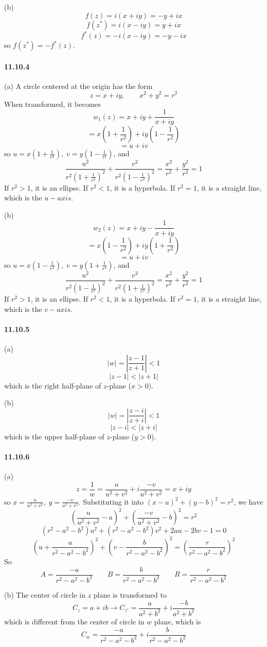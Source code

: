 \documentclass[a4paper]{article}
\begin{document}
(b)
\[
f(z)=i(x+iy)=-y+ix
\]
\[
f(z^*)=i(x-iy)=y+ix
\]
\[
f^*(z)=-i(x-iy)=-y-ix
\]
so $f(z^*)=-f^*(z)$.

\paragraph{11.10.4}
(a)
A circle centered at the origin has the form
\[
z=x+iy,\qquad x^2+y^2=r^2
\]
When transformed, it becomes
\[
w_1(z)=x+iy+\frac{1}{x+iy}
\]
\[
=x(1+\frac{1}{r^2})+iy(1-\frac{1}{r^2})
\]
\[
=u+iv
\]
so $u=x(1+\frac{1}{r^2}),\;v=y(1-\frac{1}{r^2})$, and
\[
\frac{u^2}{r^2(1+\frac{1}{r^2})^2}+\frac{v^2}{r^2(1-\frac{1}{r^2})^2}=\frac{x^2}{r^2}+\frac{y^2}{r^2}=1
\]
If $r^2>1$, it is an ellipse. If $r^2<1$, it is a hyperbola. If $r^2=1$, it is a straight line, which is the $u-axis$.
\medskip

(b)
\[
w_2(z)=x+iy-\frac{1}{x+iy}
\]
\[
=x(1-\frac{1}{r^2})+iy(1+\frac{1}{r^2})
\]
\[
=u+iv
\]
so $u=x(1-\frac{1}{r^2}),\;v=y(1+\frac{1}{r^2})$, and
\[
\frac{u^2}{r^2(1-\frac{1}{r^2})^2}+\frac{v^2}{r^2(1+\frac{1}{r^2})^2}=\frac{x^2}{r^2}+\frac{y^2}{r^2}=1
\]
If $r^2>1$, it is an ellipse. If $r^2<1$, it is a hyperbola. If $r^2=1$, it is a straight line, which is the $v-axis$.

\paragraph{11.10.5}
(a)
\[
|w|=\left|\frac{z-1}{z+1} \right|<1
\]
\[
|z-1|<|z+1|
\]
which is the right half-plane of $z$-plane ($x>0$).
\medskip

(b)
\[
|w|=\left|\frac{z-i}{z+i} \right|<1
\]
\[
|z-i|<|z+i|
\]
which is the upper half-plane of $z$-plane ($y>0$).

\paragraph{11.10.6}
(a)
\[
z=\frac{1}{w}=\frac{u}{u^2+v^2}+i\frac{-v}{u^2+v^2}=x+iy
\]
so $x=\frac{u}{u^2+v^2},\;y=\frac{-v}{u^2+v^2}$. Substituting it into $(x-a)^2+(y-b)^2=r^2$, we have
\[
\left(\frac{u}{u^2+v^2}-a \right)^2+\left(\frac{-v}{u^2+v^2}-b \right)^2=r^2
\]
\[
(r^2-a^2-b^2)u^2+(r^2-a^2-b^2)v^2+2au-2bv-1=0
\]
\[
\left(u+\frac{a}{r^2-a^2-b^2} \right)^2+\left(v-\frac{b}{r^2-a^2-b^2} \right)^2=\left(\frac{r}{r^2-a^2-b^2}\right)^2
\]
So
\[
A=\frac{-a}{r^2-a^2-b^2}\qquad B=\frac{b}{r^2-a^2-b^2}\qquad R=\frac{r}{r^2-a^2-b^2}
\]
\medskip

(b)
The center of circle in $z$ plane is transformed to
\[
C_z=a+ib\rightarrow C_{z'}=\frac{a}{a^2+b^2}+i\frac{-b}{a^2+b^2}
\]
which is different from the center of circle in $w$ plane, which is
\[
C_w=\frac{-a}{r^2-a^2-b^2}+i\frac{b}{r^2-a^2-b^2}
\]
\end{document}

